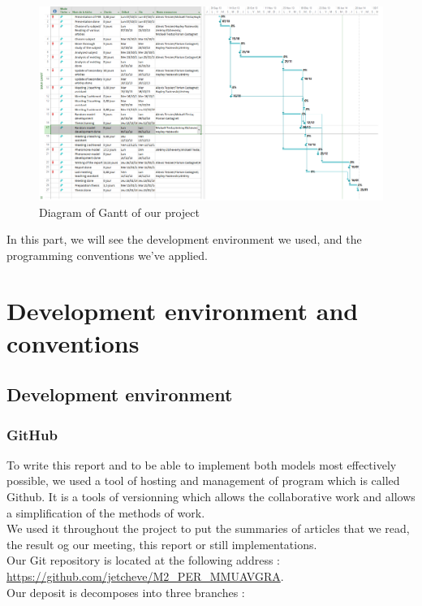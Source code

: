 \begin{figure}[htbf]
\center
\includegraphics[scale=0.7]{../images/Gantt.png}
\caption{\label{Gantt}Diagram of Gantt of our project}
\end{figure}

In this part, we will see the development environment we used, and the programming conventions we've applied.

\chapter{Development environment and conventions}

\section{Development environment}

\subsection{GitHub}

To write this report and to be able to implement both models most effectively possible, we used a tool of hosting and management of program which is called Github. It is a tools of versionning which allows the collaborative work and allows a simplification of the methods of work.\\
We used it throughout the project to put the summaries of articles that we read, the result og our meeting, this report or still implementations.\\
Our Git repository is located at the following address : \\
\url{https://github.com/jetcheve/M2\_PER\_MMUAVGRA}.\\

Our deposit is decomposes into three branches :

